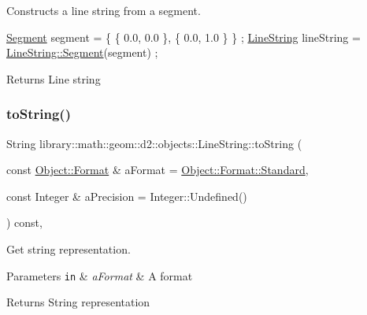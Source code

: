 Constructs a line string from a segment. 


\begin{DoxyCode}
\hyperlink{classlibrary_1_1math_1_1geom_1_1d2_1_1objects_1_1_line_string_a382892044a21b1b7e2717117adef35db}{Segment} segment = \{ \{ 0.0, 0.0 \}, \{ 0.0, 1.0 \} \} ;
\hyperlink{classlibrary_1_1math_1_1geom_1_1d2_1_1objects_1_1_line_string_aa313a076051c7fb722b9eeb6d5bf2f7e}{LineString} lineString = \hyperlink{classlibrary_1_1math_1_1geom_1_1d2_1_1objects_1_1_line_string_a382892044a21b1b7e2717117adef35db}{LineString::Segment}(segment) ;
\end{DoxyCode}


\begin{DoxyReturn}{Returns}
Line string 
\end{DoxyReturn}
\mbox{\label{classlibrary_1_1math_1_1geom_1_1d2_1_1objects_1_1_line_string_a13c0a7c5b8da7724b5a2dd2933064768}} 
\subsubsection{\texorpdfstring{to\+String()}{toString()}}
{\footnotesize\ttfamily String library\+::math\+::geom\+::d2\+::objects\+::\+Line\+String\+::to\+String (\begin{DoxyParamCaption}\item[{const \hyperlink{classlibrary_1_1math_1_1geom_1_1d2_1_1_object_ac8cd61dada4960cfee9a469231621b17}{Object\+::\+Format} \&}]{a\+Format = {\ttfamily \hyperlink{classlibrary_1_1math_1_1geom_1_1d2_1_1_object_ac8cd61dada4960cfee9a469231621b17aeb6d8ae6f20283755b339c0dc273988b}{Object\+::\+Format\+::\+Standard}},  }\item[{const Integer \&}]{a\+Precision = {\ttfamily Integer\+:\+:Undefined()} }\end{DoxyParamCaption}) const\hspace{0.3cm}{\ttfamily [override]}, {\ttfamily [virtual]}}



Get string representation. 


\begin{DoxyParams}[1]{Parameters}
\mbox{\tt in}  & {\em a\+Format} & A format \\
\hline
\end{DoxyParams}
\begin{DoxyReturn}{Returns}
String representation 
\end{DoxyReturn}


